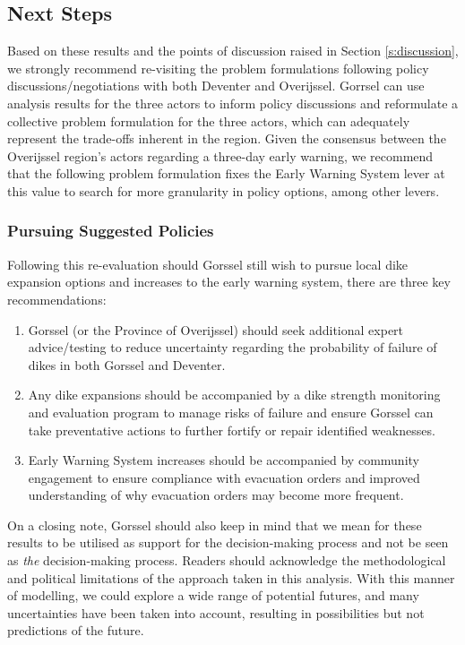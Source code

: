 \subsection{Next Steps}
Based on these results and the points of discussion raised in Section \ref{s:discussion}, we strongly recommend re-visiting the problem formulations following policy discussions/negotiations with both Deventer and Overijssel. Gorrsel can use analysis results for the three actors to inform policy discussions and reformulate a collective problem formulation for the three actors, which can adequately represent the trade-offs inherent in the region. Given the consensus between the Overijssel region's actors regarding a three-day early warning, we recommend that the following problem formulation fixes the Early Warning System lever at this value to search for more granularity in policy options, among other levers.

\subsubsection{Pursuing Suggested Policies}
Following this re-evaluation should Gorssel still wish to pursue local dike expansion options and increases to the early warning system, there are three key recommendations:
\begin{enumerate}
    \item Gorssel (or the Province of Overijssel) should seek additional expert advice/testing to reduce uncertainty regarding the probability of failure of dikes in both Gorssel and Deventer.
    \item Any dike expansions should be accompanied by a dike strength monitoring and evaluation program to manage risks of failure and ensure Gorssel can take preventative actions to further fortify or repair identified weaknesses.
    \item Early Warning System increases should be accompanied by community engagement to ensure compliance with evacuation orders and improved understanding of why evacuation orders may become more frequent.
\end{enumerate}

\noindent On a closing note, Gorssel should also keep in mind that we mean for these results to be utilised as support for the decision-making process and not be seen as \textit{the} decision-making process. Readers should acknowledge the methodological and political limitations of the approach taken in this analysis. With this manner of modelling, we could explore a wide range of potential futures, and many uncertainties have been taken into account, resulting in possibilities but not predictions of the future.